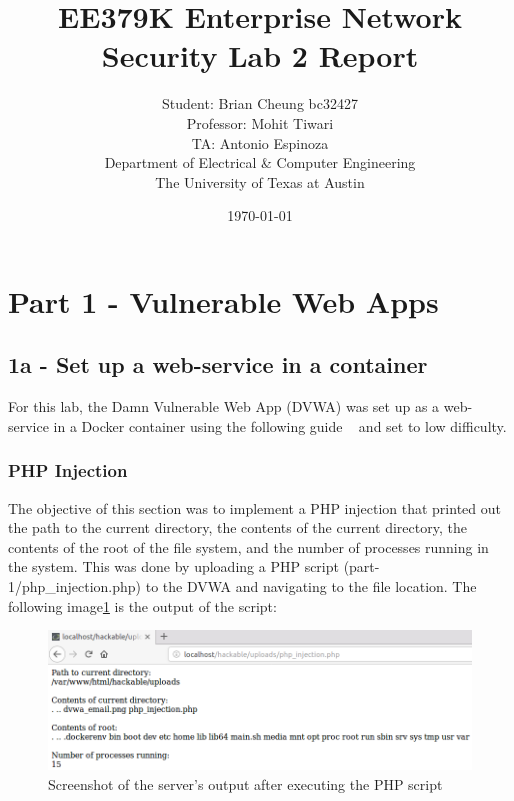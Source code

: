 \documentclass[11pt]{article}
\author{Student: Brian Cheung bc32427 \\ Professor: Mohit Tiwari \\ TA: Antonio Espinoza \\ Department of Electrical \& Computer Engineering \\ The University of Texas at Austin}
\date{\today}
\title{EE379K Enterprise Network Security Lab 2 Report}
\begin{document}
\maketitle
\newpage
\section*{Part 1 - Vulnerable Web Apps}
\label{sec:part-1}
\subsection*{1a - Set up a web-service in a container}
For this lab, the Damn Vulnerable Web App (DVWA) was set up as a web-service in a Docker container
using the following guide ~\cite{dvwa} and set to low difficulty.

\subsubsection*{PHP Injection}
The objective of this section was to implement a PHP injection that printed out the path to the current directory,
the contents of the current directory, the contents of the root of the file system, and the number of processes running in the system.
This was done by uploading a PHP script (part-1/php\_injection.php) to the DVWA and navigating to the file location.
The following image\ref{fig:php-injection} is the output of the script:
\begin{figure}[htbp]
  \centering
  \includegraphics[width=.9\linewidth]{./php-injection.png}
  \caption{\label{fig:php-injection}
  Screenshot of the server's output after executing the PHP script}
\end{figure}
\end{document}
